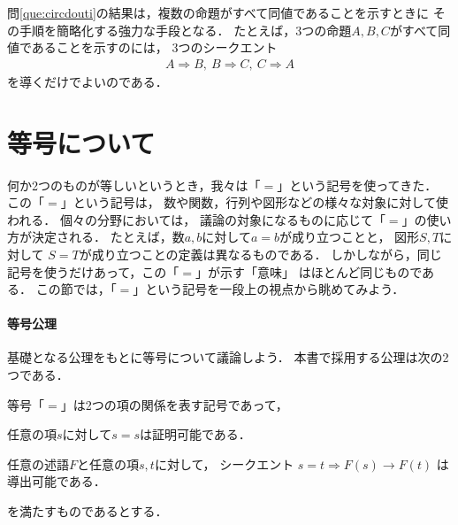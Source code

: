    問\ref{que:circdouti}の結果は，複数の命題がすべて同値であることを示すときに
   その手順を簡略化する強力な手段となる．
   たとえば，3つの命題$A,  B,  C$がすべて同値であることを示すのには，
   3つのシークエント
   \begin{align*}
     A \Longrightarrow B  ,\   B \Longrightarrow C  ,\   C \Longrightarrow A
   \end{align*}
   を導くだけでよいのである．  
 \section{等号について}
 \label{sec:equal}
   何か2つのものが等しいというとき，我々は「$=$」という記号を使ってきた．
   この「$=$」という記号は，
   数や関数，行列や図形などの様々な対象に対して使われる．
   個々の分野においては，
   議論の対象になるものに応じて「$=$」の使い方が決定される．
   たとえば，数$a,  b$に対して$a = b$が成り立つことと，
   図形$S,  T$に対して
   $S=T$が成り立つことの定義は異なるものである．
   しかしながら，同じ記号を使うだけあって，この「$=$」が示す「意味」
   はほとんど同じものである．
   この節では，「$=$」という記号を一段上の視点から眺めてみよう．

   \paragraph{等号公理}
   基礎となる公理をもとに等号について議論しよう．
   本書で採用する公理は次の2つである．
   
   \begin{axiom}[等号公理]
     等号「$=$」は2つの項の関係を表す記号であって，
     \begin{description}
       \item[反射律] 任意の項$s$に対して$s =s$は証明可能である．
       \item[置換法則] 任意の述語$F$と任意の項$s,  t$に対して，
             シークエント
             $s=t \Longrightarrow F(s) \to F(t) $
             は導出可能である．
         \end{description}
     を満たすものであるとする．
   \end{axiom}

